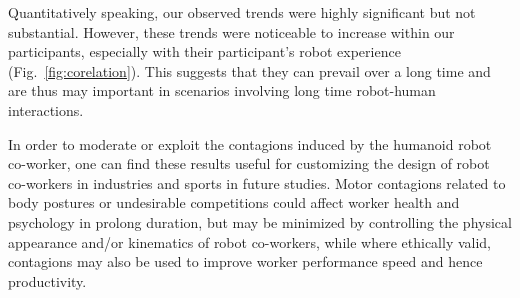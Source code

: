 Quantitatively speaking, our observed trends were highly significant but not substantial. However, these trends were noticeable to increase within our participants, especially with their participant's robot experience (Fig.~\ref{fig:corelation}). This suggests that they can prevail over a long time and are thus may important in scenarios involving long time robot-human interactions. 

In order to moderate or exploit the contagions induced by the humanoid robot co-worker, one can find these results useful for customizing the design of robot co-workers in industries and sports in future studies. Motor contagions related to body postures or undesirable competitions could affect worker health and psychology in prolong duration, but may be minimized by controlling the physical appearance and/or kinematics of robot co-workers, while where ethically valid, contagions may also be used to improve worker performance speed and hence productivity.


\clearpage %






